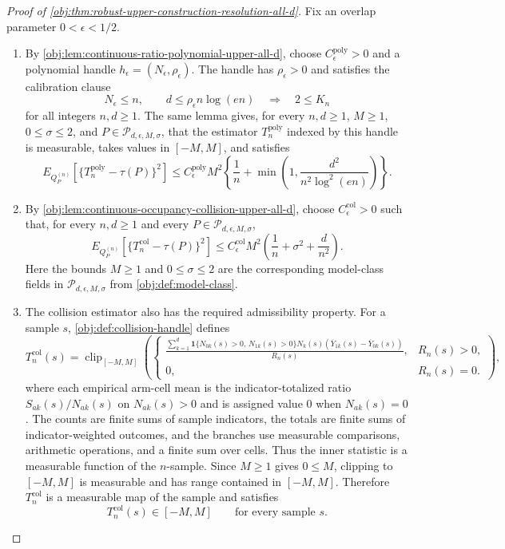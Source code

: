 \begin{proof}[Proof of \cref{obj:thm:robust-upper-construction-resolution-all-d}]
Fix an overlap parameter \(0<\epsilon<1/2\).
\begin{enumerate}
\item By \cref{obj:lem:continuous-ratio-polynomial-upper-all-d}, choose
\(C_{\epsilon}^{\mathrm{poly}}>0\) and a polynomial handle
\(h_{\epsilon}=(N_{\epsilon},\rho_{\epsilon})\).  The handle has
\(\rho_{\epsilon}>0\) and satisfies the calibration clause
\[
N_{\epsilon}\le n,\qquad d\le \rho_{\epsilon}n\log(en)
\quad\Longrightarrow\quad
2\le K_n
\]
for all integers \(n,d\ge1\).  The same lemma gives, for every
\(n,d\ge1\), \(M\ge1\), \(0\le\sigma\le2\), and
\(P\in\mathcal P_{d,\epsilon,M,\sigma}\), that the estimator
\(T_n^{\mathrm{poly}}\) indexed by this handle is measurable, takes values in
\([-M,M]\), and satisfies
\[
E_{Q_P^{(n)}}\!\left[
\{T_n^{\mathrm{poly}}-\tau(P)\}^2
\right]
\le
C_{\epsilon}^{\mathrm{poly}}M^2
\left\{
\frac1n+\min\!\left(1,\frac{d^2}{n^2\log^2(en)}\right)
\right\}.
\]

\item By \cref{obj:lem:continuous-occupancy-collision-upper-all-d}, choose
\(C_{\epsilon}^{\mathrm{col}}>0\) such that, for every \(n,d\ge1\) and every
\(P\in\mathcal P_{d,\epsilon,M,\sigma}\),
\[
E_{Q_P^{(n)}}\!\left[
\{T_n^{\mathrm{col}}-\tau(P)\}^2
\right]
\le
C_{\epsilon}^{\mathrm{col}}M^2
\left(
\frac1n+\sigma^2+\frac{d}{n^2}
\right).
\]
Here the bounds \(M\ge1\) and \(0\le\sigma\le2\) are the corresponding
model-class fields in \(\mathcal P_{d,\epsilon,M,\sigma}\) from
\cref{obj:def:model-class}.

\item The collision estimator also has the required admissibility property.  For a
sample \(s\), \cref{obj:def:collision-handle} defines
\[
T_n^{\mathrm{col}}(s)
=
\operatorname{clip}_{[-M,M]}
\left(
\begin{cases}
\displaystyle
\frac{
\sum_{k=1}^d
\mathbf 1\{N_{0k}(s)>0,\,N_{1k}(s)>0\}
N_k(s)
\left(
\overline Y_{1k}(s)-\overline Y_{0k}(s)
\right)
}{R_n(s)},&R_n(s)>0,\\[2ex]
0,&R_n(s)=0.
\end{cases}
\right),
\]
where each empirical arm-cell mean is the indicator-totalized ratio
\(S_{ak}(s)/N_{ak}(s)\) on \(N_{ak}(s)>0\) and is assigned value \(0\) when
\(N_{ak}(s)=0\).  The counts are finite sums of sample indicators, the totals
are finite sums of indicator-weighted outcomes, and the branches use
measurable comparisons, arithmetic operations, and a finite sum over cells.
Thus the inner statistic is a measurable function of the \(n\)-sample.  Since
\(M\ge1\) gives \(0\le M\), clipping to \([-M,M]\) is measurable and has range
contained in \([-M,M]\).  Therefore \(T_n^{\mathrm{col}}\) is a measurable map
of the sample and satisfies
\[
T_n^{\mathrm{col}}(s)\in[-M,M]
\qquad\text{for every sample }s.
\]


\end{enumerate}
\end{proof}
